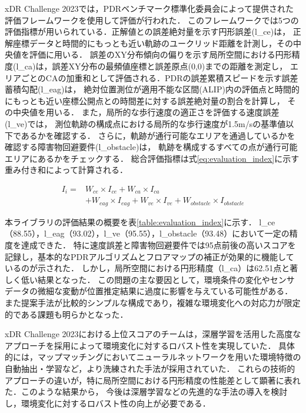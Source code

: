 xDR Challenge 2023では，PDRベンチマーク標準化委員会によって提供された評価フレームワークを使用して評価が行われた．
このフレームワークでは5つの評価指標が用いられている．正解値との誤差絶対量を示す円形誤差(l\_ce)は，
正解座標データと時間的にもっとも近い軌跡のユークリッド距離を計測し，その中央値を評価に用いる．
誤差のXY分布傾向の偏りを示す局所空間における円形精度(l\_ca)は，誤差XY分布の最頻値座標と誤差原点(0,0)までの距離を測定し，
エリアごとのCAの加重和として評価される．PDRの誤差累積スピードを示す誤差蓄積勾配(l\_eag)は，
絶対位置測位が適用不能な区間(ALIP)内の評価点と時間的にもっとも近い座標公開点との時間差に対する誤差絶対量の割合を計算し，
その中央値を用いる．
また，局所的な歩行速度の適正さを評価する速度誤差(l\_ve)では，
測位軌跡の構成点における局所的な歩行速度が1.5m/sの基準値以下であるかを確認する．
さらに，軌跡が通行可能なエリアを通過しているかを確認する障害物回避要件(l\_obstacle)は，
軌跡を構成するすべての点が通行可能エリアにあるかをチェックする．
総合評価指標は式\ref{eq:evaluation_index}に示す重み付き和によって計算される．

\begin{equation}
	\begin{aligned}
		I_i = & W_{ce} \times I_{ce} + W_{ca} \times I_{ca}                                        \\
		      & + W_{eag} \times I_{eag} + W_{ve} \times I_{ve} + W_{obstacle} \times I_{obstacle}
	\end{aligned}
	\label{eq:evaluation_index}
\end{equation}

本ライブラリの評価結果の概要を表\ref{table:evaluation_index}に示す．
l\_ce（88.55），l\_eag（93.02），l\_ve（95.55），l\_obstacle（93.48）において一定の精度を達成できた．
特に速度誤差と障害物回避要件では95点前後の高いスコアを記録し，基本的なPDRアルゴリズムとフロアマップの補正が効果的に機能しているのが示された．
しかし，局所空間における円形精度（l\_ca）は62.51点と著しく低い結果となった．
この問題の主な要因として，環境条件の変化やセンサデータの微細な変動が位置推定結果に過度に影響を与えている可能性がある．
また提案手法が比較的シンプルな構成であり，複雑な環境変化への対応力が限定的である課題も明らかとなった．

xDR Challenge 2023における上位スコアのチームは，深層学習を活用した高度なアプローチを採用によって環境変化に対するロバスト性を実現していた．
具体的には，マップマッチングにおいてニューラルネットワークを用いた環境特徴の自動抽出・学習など，より洗練された手法が採用されていた．
これらの技術的アプローチの違いが，特に局所空間における円形精度の性能差として顕著に表れた．このような結果から，
今後は深層学習などの先進的な手法の導入を検討し，環境変化に対するロバスト性の向上が必要である．


